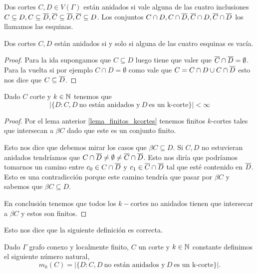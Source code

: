 \documentclass[tesis.tex]{subfiles}
\begin{document}
\begin{deff}
	Dos cortes $C,D \in V(\Gamma)$ están anidados si vale alguna de las cuatro inclusiones $C \subseteq D, C \subseteq \overline D, \overline C \subseteq \overline D, \overline C \subseteq D$.
	Los conjuntos $C \cap D, C \cap \overline D, \overline C \cap D, \overline C \cap \overline D$ los llamamos las esquinas.
\end{deff}

\begin{lema}
	Dos cortes $C,D$ están anidados si y solo si alguna de las cuatro esquinas es vacía.
\end{lema}
\begin{proof}
	Para la ida supongamos que $C \subseteq D$ luego tiene que valer que $\overline C \cap \overline D = \emptyset$.
	Para la vuelta si por ejemplo $C \cap D = \emptyset$ como vale que $C = C \cap D \cup C \cap \overline D$ esto nos dice que $C \subseteq \overline D$.
\end{proof}

\begin{lema}
	Dado $C$ corte y $k \in \mathbb{N}$ tenemos que 
	\[
		| \{  D : C, D \ \text{no están anidados y} \ D \ \text{es un k-corte}   \} | < \infty
	\]
\end{lema}
\begin{proof}
	Por el lema anterior \ref{lema_finitos_kcortes} tenemos finitos $k$-cortes tales que intersecan a $\beta C$ dado que este es un conjunto finito.
	
	Esto nos dice que debemos mirar los casos que $\beta C \subseteq D$.
	Si $C,D$ no estuvieran anidados tendríamos que $C \cap \overline D \neq \emptyset \neq \overline C \cap \overline D$.
	Esto nos diría que podríamos tomarnos un camino entre $c_0 \in C \cap \overline D$ y $c_1 \in \overline C \cap \overline D$ tal que esté contenido en $\overline D$.
	Esto es una contradicción porque este camino tendría que pasar por $\beta C$ y sabemos que $\beta C \subseteq D$.

	En conclusión tenemos que todos los $k-$cortes no anidados tienen que intersecar a $\beta C$ y estos son finitos.			
\end{proof}

Esto nos dice que la siguiente definición es correcta.

\begin{deff}
	Dado $\Gamma$ grafo conexo y localmente finito, $C$ un corte y $k \in \mathbb{N}$ constante definimos el siguiente número natural,
	\[
		m_k(C) = | \{  D : C, D \ \text{no están anidados y} \ D \ \text{es un k-corte}   \} |. 
	\]
\end{deff}
\end{document}
